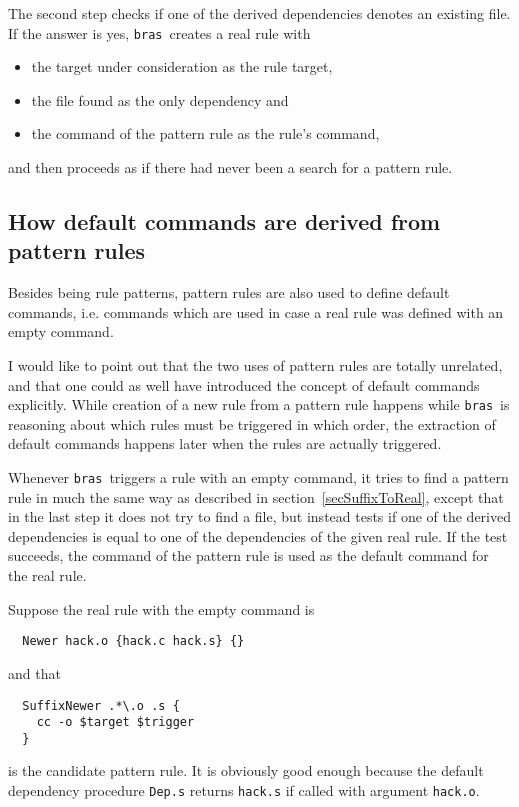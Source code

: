 \documentclass[12pt]{article}
\newcommand{\bras}{\texttt{bras}}
\begin{document}
The second step checks if one of
the derived dependencies denotes an existing file.
If the answer is yes, \bras\ creates a real rule with
\begin{itemize}
\item the target under consideration as the rule target,
\item the file found as the only dependency and
\item the command of the pattern rule as the rule's command,
\end{itemize}
and then proceeds as if there had never been a search for a pattern
rule.

\subsection{How default commands are derived from pattern rules}
\label{secSuffixAsDefCmd}
Besides being rule patterns, pattern rules are also used to define
default commands, i.e. commands which are used in case a real rule was
defined with an empty command.

I would like to point out that the two uses of pattern rules are
totally unrelated, and that one could as well have introduced the
concept of default commands explicitly. While creation of a new rule
from a pattern rule happens while \bras\ is reasoning about which rules
must be triggered in which order, the extraction of default commands
happens later when the rules are actually triggered. 

Whenever \bras\ triggers a rule with an empty command, it tries to
find a pattern rule in much the same way as described in
section~\ref{secSuffixToReal}, except that in the last step it does
not try to find a file, but instead tests if one of the derived
dependencies is equal to one of the dependencies of the given real
rule. If the test succeeds, the command of the pattern rule is used as
the default command for the real rule.

Suppose the real rule with the empty command is
\begin{verbatim}
  Newer hack.o {hack.c hack.s} {}
\end{verbatim}
and that
\begin{verbatim}
  SuffixNewer .*\.o .s {
    cc -o $target $trigger
  }
\end{verbatim}
is the candidate pattern rule. It is obviously good enough
because the default dependency procedure \texttt{Dep.s} returns
\texttt{hack.s} if called with argument \texttt{hack.o}.
\end{document}
